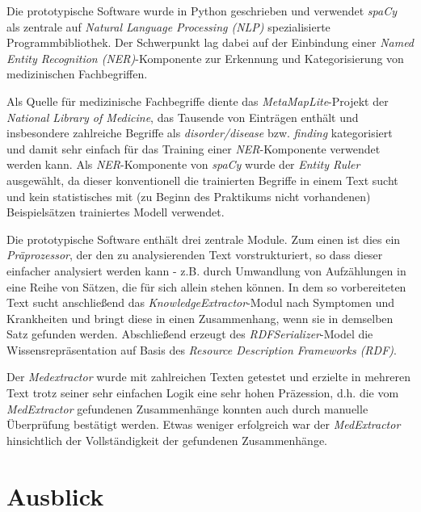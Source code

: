 Die prototypische Software wurde in Python geschrieben und verwendet \emph{spaCy} als zentrale auf \emph{Natural Language Processing (NLP)} spezialisierte Programmbibliothek. Der Schwerpunkt lag dabei auf der Einbindung einer \emph{Named Entity Recognition (NER)}-Komponente zur Erkennung und Kategorisierung von medizinischen Fachbegriffen.

Als Quelle für medizinische Fachbegriffe diente das \emph{MetaMapLite}-Projekt der \emph{National Library of Medicine}, das Tausende von Einträgen enthält und insbesondere zahlreiche Begriffe als \emph{disorder/disease} bzw. \emph{finding} kategorisiert und damit sehr einfach für das Training einer \emph{NER}-Komponente verwendet werden kann. Als \emph{NER}-Komponente von \emph{spaCy} wurde der \emph{Entity Ruler} ausgewählt, da dieser konventionell die trainierten Begriffe in einem Text sucht und kein statistisches mit (zu Beginn des Praktikums nicht vorhandenen) Beispielsätzen trainiertes Modell verwendet.

Die prototypische Software enthält drei zentrale Module. Zum einen ist dies ein \emph{Präprozessor}, der den zu analysierenden Text vorstrukturiert, so dass dieser einfacher analysiert werden kann - z.B. durch Umwandlung von Aufzählungen in eine Reihe von Sätzen, die für sich allein stehen können. In dem so vorbereiteten Text sucht anschließend das \emph{KnowledgeExtractor}-Modul nach Symptomen und Krankheiten und bringt diese in einen Zusammenhang, wenn sie in demselben Satz gefunden werden. Abschließend erzeugt des \emph{RDFSerializer}-Model die Wissensrepräsentation auf Basis des \emph{Resource Description Frameworks (RDF)}.

Der \emph{Medextractor} wurde mit zahlreichen Texten getestet und erzielte in mehreren Text trotz seiner sehr einfachen Logik eine sehr hohen Präzession, d.h. die vom \emph{MedExtractor} gefundenen Zusammenhänge konnten auch durch manuelle Überprüfung bestätigt werden. Etwas weniger erfolgreich war der \emph{MedExtractor} hinsichtlich der Vollständigkeit der gefundenen Zusammenhänge.


\section{Ausblick}
\label{sec:Ausblick} 